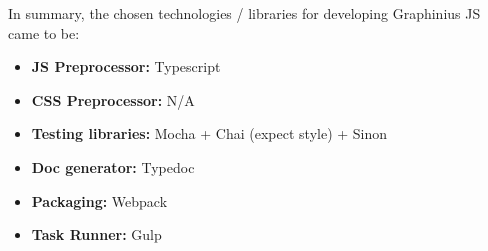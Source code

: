 In summary, the chosen technologies / libraries for developing Graphinius JS came to be:

\begin{itemize}
	\item \textbf{JS Preprocessor:} Typescript
	\item \textbf{CSS Preprocessor:} N/A
	\item \textbf{Testing libraries:} Mocha + Chai (expect style) + Sinon
	\item \textbf{Doc generator:} Typedoc
	\item \textbf{Packaging:} Webpack
	\item \textbf{Task Runner:} Gulp
\end{itemize}
